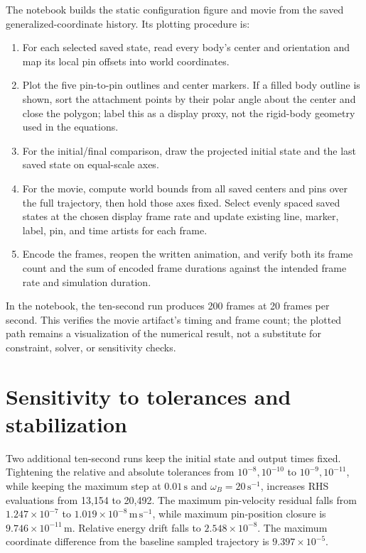 \documentclass[../main.tex]{subfiles}
\begin{document}
The notebook builds the static configuration figure and movie from the saved generalized-coordinate history. Its plotting procedure is:
\begin{enumerate}
\item For each selected saved state, read every body's center and orientation and map its local pin offsets into world coordinates.
\item Plot the five pin-to-pin outlines and center markers. If a filled body outline is shown, sort the attachment points by their polar angle about the center and close the polygon; label this as a display proxy, not the rigid-body geometry used in the equations.
\item For the initial/final comparison, draw the projected initial state and the last saved state on equal-scale axes.
\item For the movie, compute world bounds from all saved centers and pins over the full trajectory, then hold those axes fixed. Select evenly spaced saved states at the chosen display frame rate and update existing line, marker, label, pin, and time artists for each frame.
\item Encode the frames, reopen the written animation, and verify both its frame count and the sum of encoded frame durations against the intended frame rate and simulation duration.
\end{enumerate}
In the notebook, the ten-second run produces 200 frames at 20 frames per second. This verifies the movie artifact's timing and frame count; the plotted path remains a visualization of the numerical result, not a substitute for constraint, solver, or sensitivity checks.

\section{Sensitivity to tolerances and stabilization}
Two additional ten-second runs keep the initial state and output times fixed. Tightening the relative and absolute tolerances from \(10^{-8},10^{-10}\) to \(10^{-9},10^{-11}\), while keeping the maximum step at \(0.01\,\mathrm{s}\) and \(\omega_B=20\,\mathrm{s}^{-1}\), increases RHS evaluations from 13,154 to 20,492. The maximum pin-velocity residual falls from \(1.247\times10^{-7}\) to \(1.019\times10^{-8}\,\mathrm{m\,s^{-1}}\), while maximum pin-position closure is \(9.746\times10^{-11}\,\mathrm m\). Relative energy drift falls to \(2.548\times10^{-8}\). The maximum coordinate difference from the baseline sampled trajectory is \(9.397\times10^{-5}\).
\end{document}
